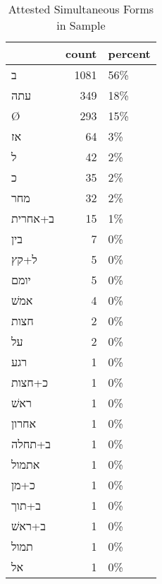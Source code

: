 \begin{table}[htbp!]
\centering
\caption{Attested Simultaneous Forms in Sample}
\label{table:sim_front}
\begin{tabular}{lrl}
\toprule
{} &  count & percent \\
\midrule
\texthebrew{ב}       &   1081 &     56\% \\
\texthebrew{עתה}     &    349 &     18\% \\
\texthebrew{Ø}       &    293 &     15\% \\
\texthebrew{אז}      &     64 &      3\% \\
\texthebrew{ל}       &     42 &      2\% \\
\texthebrew{כ}       &     35 &      2\% \\
\texthebrew{מחר}     &     32 &      2\% \\
\texthebrew{ב+אחרית} &     15 &      1\% \\
\texthebrew{בין}     &      7 &      0\% \\
\texthebrew{ל+קץ}    &      5 &      0\% \\
\texthebrew{יומם}    &      5 &      0\% \\
\texthebrew{אמשׁ}    &      4 &      0\% \\
\texthebrew{חצות}    &      2 &      0\% \\
\texthebrew{על}      &      2 &      0\% \\
\texthebrew{רגע}     &      1 &      0\% \\
\texthebrew{כ+חצות}  &      1 &      0\% \\
\texthebrew{ראשׁ}    &      1 &      0\% \\
\texthebrew{אחרון}   &      1 &      0\% \\
\texthebrew{ב+תחלה}  &      1 &      0\% \\
\texthebrew{אתמול}   &      1 &      0\% \\
\texthebrew{כ+מן}    &      1 &      0\% \\
\texthebrew{ב+תוך}   &      1 &      0\% \\
\texthebrew{ב+ראשׁ}  &      1 &      0\% \\
\texthebrew{תמול}    &      1 &      0\% \\
\texthebrew{אל}      &      1 &      0\% \\
\bottomrule
\end{tabular}
\end{table}
